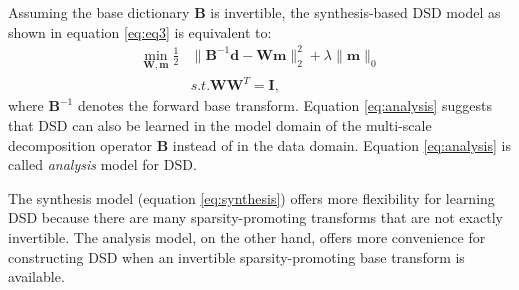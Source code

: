 Assuming the base dictionary $\mathbf{B}$ is invertible, the synthesis-based DSD model as shown in equation \ref{eq:eq3} is equivalent to:
\begin{equation}
\label{eq:analysis}
\begin{split}
\min_{\mathbf{W,m}}  \frac{1}{2}&\parallel \mathbf{B}^{-1}\mathbf{d} - \mathbf{Wm} \parallel_2^2 + \lambda\parallel \mathbf{m} \parallel_0 \\
&s.t. \mathbf{W}\mathbf{W}^T = \mathbf{I},
\end{split}
\end{equation}
where $\mathbf{B}^{-1}$ denotes the forward base transform. Equation \ref{eq:analysis} suggests that DSD can also be learned in the model domain of the multi-scale decomposition operator $\mathbf{B}$ instead of in the data domain. Equation \ref{eq:analysis} is called \emph{analysis} model for DSD.

The synthesis model (equation \ref{eq:synthesis}) offers more flexibility for learning DSD because there are many sparsity-promoting transforms that are not exactly invertible. The analysis model, on the other hand, offers more convenience for constructing DSD when an invertible sparsity-promoting 
base transform is available. 



